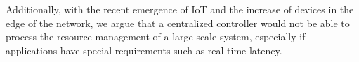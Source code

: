 Additionally, with the recent emergence of IoT and the increase of devices in the edge of the network, we argue that a centralized controller would not be able to process the resource management of a large scale system, especially if applications have special requirements such as real-time latency.












